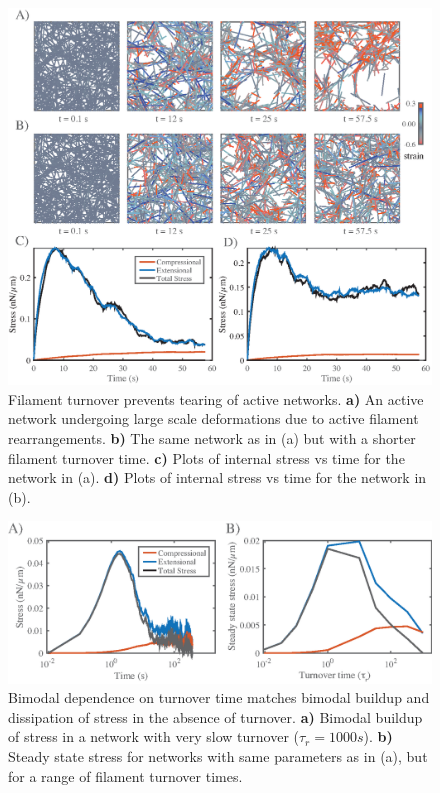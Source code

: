 \begin{figure}[h!]
	\centering
	\includegraphics[width=\hsize]{active/figures/FigS4}
	\caption{\label{fig:active_tear}  Filament turnover prevents tearing of active networks.  \textbf{a)}  An active network undergoing large scale deformations due to active filament rearrangements.  \textbf{b)}  The same network as in (a) but with a shorter filament turnover time.  \textbf{c)}  Plots of internal stress vs time for the network in (a).  \textbf{d)}  Plots of internal stress vs time for the network in (b).  }
\end{figure}

\begin{figure}[h!]
	\centering
	\includegraphics[width=\hsize]{active/figures/FigS5}
	\caption{\label{fig:recycle_supp}  Bimodal dependence on turnover time matches bimodal buildup and dissipation of stress in the absence of turnover.  \textbf{a)}  Bimodal buildup of stress in a network with very slow turnover ($\tau_r = 1000s$).  \textbf{b)}  Steady state stress for networks with same parameters as in (a), but  for a range of filament turnover times.   }
\end{figure}

